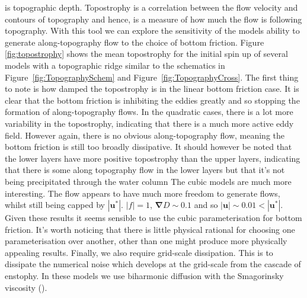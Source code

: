 \documentclass[12pt,a4paper]{report}
\newcommand*\figref[1]{Figure~\ref{#1}}
\begin{document}
  is topographic depth. Topostrophy is a correlation between the flow velocity
  and contours of topography and hence, is a measure of how much the flow is
  following topography. With this tool we can explore the sensitivity of the models
  ability to generate along-topography flow to the choice of bottom friction. 
  Figure \ref{fig:topostrophy} shows the mean topostrophy for the
  initial spin up of several models with a topographic ridge similar to
  the schematics in \figref{fig:TopographySchem} and
	\figref{fig:TopographyCross}. The first thing to note is how damped the 
  topostrophy is in the linear
  bottom friction case. It is clear that the bottom friction is inhibiting the 
  eddies greatly and so stopping the formation of along-topography flows. In
  the quadratic cases, there is a lot more variability in the topostrophy, indicating
  that there is a much more active eddy field. However again, there is no obvious
  along-topography flow, meaning the bottom friction is still too broadly dissipative.
  It should however be noted that the lower layers have more positive topostrophy than
  the upper layers, indicating that there is some along topography flow in the lower 
  layers but that it's not being precipitated  through the water column
  The cubic models are much more interesting. The flow appears to have much more
  freedom to generate flows, whilst still being capped by $\left|\boldsymbol{u}^{\ast}\right|$. $\left|f\right| = 1$, $\boldsymbol{\nabla} D \sim 0.1$ and so $\left|\boldsymbol{u}\right| \sim 0.01 < \left|\boldsymbol{u}^{\ast}\right|$.
  Given these results it seems sensible to use the cubic parameterisation for bottom 
  friction. It's worth noticing that there is little physical rational for choosing
  one parameterisation over another, other than one might produce more physically 
  appealing results. Finally, we also require grid-scale dissipation. This is to dissipate the
  numerical noise which develops at the grid-scale from the cascade of enstophy.
  In these models we use biharmonic diffusion with the Smagorinsky viscosity (\cite{smagorinsky1963general}). 
  
\end{document}
